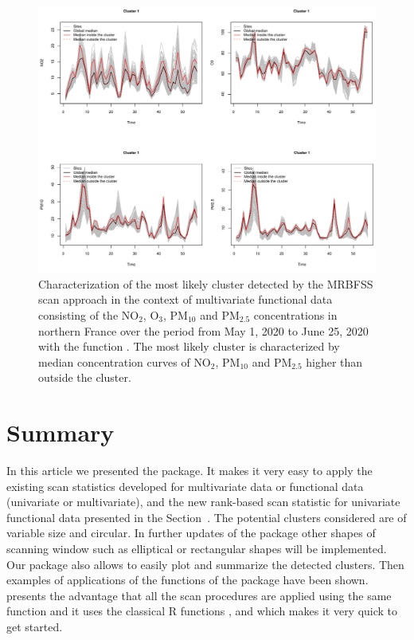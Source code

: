 \begin{figure}[htbp]
\centering
\includegraphics[width=\linewidth]{summary_mrbfss.pdf}
\caption{
Characterization of the most likely cluster detected by the MRBFSS scan approach in the context of multivariate functional data consisting of the $\text{NO}_2$, $\text{O}_3$, $\text{PM}_{10}$ and $\text{PM}_{2.5}$ concentrations in northern France over the period from May 1, 2020 to June 25, 2020 with the function .
The most likely cluster is characterized by median concentration curves of $\text{NO}_2$, $\text{PM}_{10}$ and $\text{PM}_{2.5}$ higher than outside the cluster.
}
\label{fig:summary_multi}
\end{figure}



\section{Summary} \label{sec:conclusion}
In this article we presented the  package. It makes it very easy to apply the existing scan statistics developed for multivariate data or functional data (univariate or multivariate), and the new rank-based scan statistic for univariate functional data presented in the Section~. 
The potential clusters considered are of variable size and circular.
In further updates of the package  other shapes of scanning window such as elliptical or rectangular shapes will be implemented.
Our package also allows to easily plot and summarize the detected clusters. Then examples of applications of the functions of the package have been shown.  presents the advantage that all the scan procedures are applied using the same function  and it uses the classical R functions ,  and  which makes it very quick to get started.

